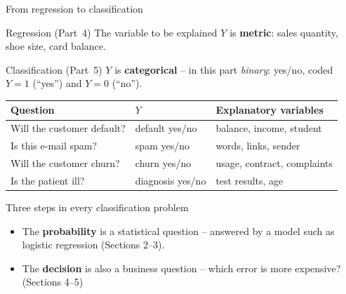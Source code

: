 \documentclass[aspectratio=169,11pt]{beamer}
\begin{document}
\begin{frame}{From regression to classification}
  \begin{block}{Regression (Part~4)}
    The variable to be explained $Y$ is \textbf{metric}: sales quantity,
    shoe size, card balance.
  \end{block}
  \begin{block}{Classification (Part~5)}
    $Y$ is \textbf{categorical} -- in this part \emph{binary}: yes/no,
    coded $Y=1$ (``yes'') and $Y=0$ (``no'').
  \end{block}
  \begin{center}
    \renewcommand{\arraystretch}{1.25}
    \begin{tabular}{@{}lll@{}}
      \toprule
      \textbf{Question} & \textbf{$Y$} & \textbf{Explanatory variables}\\
      \midrule
      Will the customer default? & default yes/no & balance, income, student\\
      Is this e-mail spam? & spam yes/no & words, links, sender\\
      Will the customer churn? & churn yes/no & usage, contract, complaints\\
      Is the patient ill? & diagnosis yes/no & test results, age\\
      \bottomrule
    \end{tabular}
  \end{center}
\end{frame}

\begin{frame}{Three steps in every classification problem}
  \centering
  \vspace{1em}
  \begin{itemize}\setlength{\itemsep}{4pt}
    \item The \textbf{probability} is a statistical question -- answered by a
          model such as logistic regression (Sections 2--3).
    \item The \textbf{decision} is also a business question -- which error
          is more expensive? (Sections 4--5)
  \end{itemize}
\end{frame}
\end{document}

